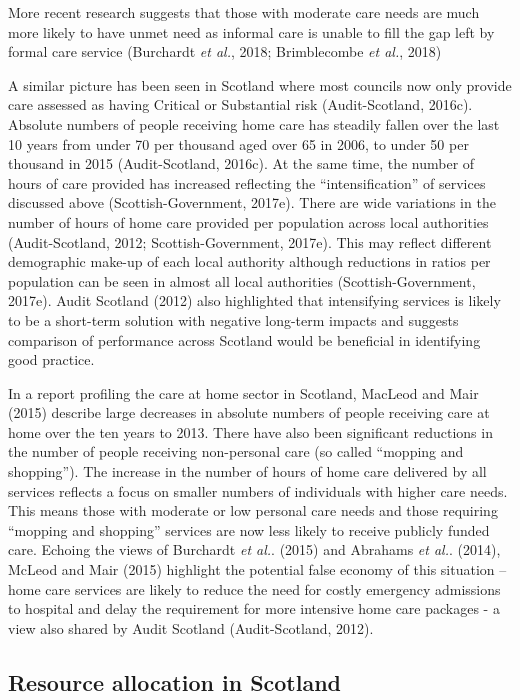 \documentclass[12pt,a4paper,oneside,table]{report}
\begin{document}
More recent research suggests that those with moderate care needs are
much more likely to have unmet need as informal care is unable to fill
the gap left by formal care service (Burchardt \emph{et al.}, 2018;
Brimblecombe \emph{et al.}, 2018)

A similar picture has been seen in Scotland where most councils now only
provide care assessed as having Critical or Substantial risk
(Audit-Scotland, 2016c). Absolute numbers of people receiving home care
has steadily fallen over the last 10 years from under 70 per thousand
aged over 65 in 2006, to under 50 per thousand in 2015 (Audit-Scotland,
2016c). At the same time, the number of hours of care provided has
increased reflecting the ``intensification'' of services discussed above
(Scottish-Government, 2017e). There are wide variations in the number of
hours of home care provided per population across local authorities
(Audit-Scotland, 2012; Scottish-Government, 2017e). This may reflect
different demographic make-up of each local authority although
reductions in ratios per population can be seen in almost all local
authorities (Scottish-Government, 2017e). Audit Scotland (2012) also
highlighted that intensifying services is likely to be a short-term
solution with negative long-term impacts and suggests comparison of
performance across Scotland would be beneficial in identifying good
practice.

In a report profiling the care at home sector in Scotland, MacLeod and
Mair (2015) describe large decreases in absolute numbers of people
receiving care at home over the ten years to 2013. There have also been
significant reductions in the number of people receiving non-personal
care (so called ``mopping and shopping''). The increase in the number of
hours of home care delivered by all services reflects a focus on smaller
numbers of individuals with higher care needs. This means those with
moderate or low personal care needs and those requiring ``mopping and
shopping'' services are now less likely to receive publicly funded care.
Echoing the views of Burchardt \textit{et al.}. (2015) and Abrahams
\textit{et al.}. (2014), McLeod and Mair (2015) highlight the potential
false economy of this situation -- home care services are likely to
reduce the need for costly emergency admissions to hospital and delay
the requirement for more intensive home care packages - a view also
shared by Audit Scotland (Audit-Scotland, 2012).

\subsection{Resource allocation in Scotland}\label{subsubsec:resources-scot}
\end{document}
